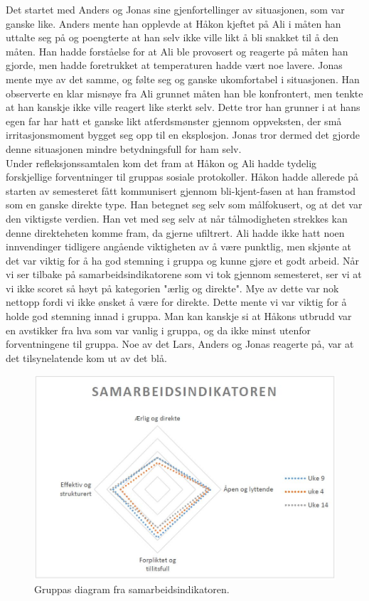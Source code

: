 Det startet med Anders og Jonas sine gjenfortellinger av situasjonen, som var ganske like. Anders mente han opplevde at Håkon kjeftet på Ali i måten han uttalte seg på og poengterte at han selv ikke ville likt å bli snakket til å den måten. Han hadde forståelse for at Ali ble provosert og reagerte på måten han gjorde, men hadde foretrukket at temperaturen hadde vært noe lavere. Jonas mente mye av det samme, og følte seg og ganske ukomfortabel i situasjonen. Han observerte en klar misnøye fra Ali grunnet måten han ble konfrontert, men tenkte at han kanskje ikke ville reagert like sterkt selv. Dette tror han grunner i at hans egen far har hatt et ganske likt atferdsmønster gjennom oppveksten, der små irritasjonsmoment bygget seg opp til en eksplosjon. Jonas tror dermed det gjorde denne situasjonen mindre betydningsfull for ham selv.\\

Under refleksjonssamtalen kom det fram at Håkon og Ali hadde tydelig forskjellige forventninger til gruppas sosiale protokoller. Håkon hadde allerede på starten av semesteret fått kommunisert gjennom bli-kjent-fasen at han framstod som en ganske direkte type. Han betegnet seg selv som målfokusert, og at det var den viktigste verdien. Han vet med seg selv at når tålmodigheten strekkes kan denne direkteheten komme fram, da gjerne ufiltrert.
Ali hadde ikke hatt noen innvendinger tidligere angående viktigheten av å være punktlig, men skjønte at det var viktig for å ha god stemning i gruppa og kunne gjøre et godt arbeid. Når vi ser tilbake på samarbeidsindikatorene som vi tok gjennom semesteret, ser vi at vi ikke scoret så høyt på kategorien "ærlig og direkte". Mye av dette var nok nettopp fordi vi ikke ønsket å være for direkte. Dette mente vi var viktig for å holde god stemning innad i gruppa. Man kan kanskje si at Håkons utbrudd var en avstikker fra hva som var vanlig i gruppa, og da ikke minst utenfor forventningene til gruppa. Noe av det Lars, Anders og Jonas reagerte på, var at det tilsynelatende kom ut av det blå.\\

\begin{figure}[H] 
    \centering
    \includegraphics[scale=0.6]{images/samind2.JPG}
    \caption{Gruppas diagram fra samarbeidsindikatoren.}
    \label{fig:my_label}
\end{figure} 


